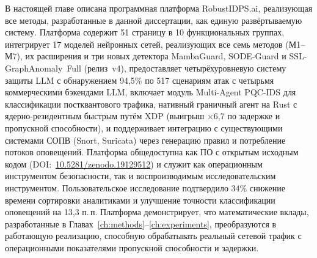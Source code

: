 В настоящей главе описана программная платформа \textsf{RobustIDPS.ai}, реализующая все методы, разработанные в данной диссертации, как единую развёртываемую систему. Платформа содержит 51 страницу в 10 функциональных группах, интегрирует 17 моделей нейронных сетей, реализующих все семь методов (М1--М7), их расширения и три новых детектора \textsf{MambaGuard}, \textsf{SODE-Guard} и \textsf{SSL-GraphAnomaly~Full} (релиз~v4), предоставляет четырёхуровневую систему защиты LLM с обнаружением 94,5\% по 517 сценариям атак с четырьмя коммерческими бэкендами LLM, включает модуль Multi-Agent PQC-IDS для классификации постквантового трафика, нативный граничный агент на Rust с ядерно-резидентным быстрым путём XDP (выигрыш $\times$6,7 по задержке и пропускной способности), и поддерживает интеграцию с существующими системами СОПВ (Snort, Suricata) через генерацию правил и потребление потоков оповещений. Платформа общедоступна как ПО с открытым исходным кодом (DOI:~\url{10.5281/zenodo.19129512}) и служит как операционным инструментом безопасности, так и воспроизводимым исследовательским инструментом. Пользовательское исследование подтвердило 34\% снижение времени сортировки аналитиками и улучшение точности классификации оповещений на 13,3 п.\,п. Платформа демонстрирует, что математические вклады, разработанные в Главах~\ref{ch:methods}--\ref{ch:experiments}, преобразуются в работающую реализацию, способную обрабатывать реальный сетевой трафик с операционными показателями пропускной способности и задержки.
